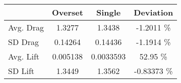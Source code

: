 \begin{tabular}{lccc}
\toprule
 & Overset & Single & Deviation \\
\toprule
Avg. Drag &1.3277 &1.3438 &-1.2011 \% \\
SD Drag &0.14264 &0.14436 &-1.1914 \% \\
Avg. Lift &0.005138 &0.0033593 &52.95 \% \\
SD Lift &1.3449 &1.3562 &-0.83373 \% \\
\toprule
\end{tabular}
